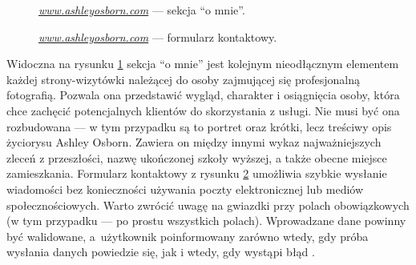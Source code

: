 \documentclass[a4paper, 12pt]{article}
\numberwithin{figure}{section}
\begin{document}
\begin{sloppypar}
\begin{figure}[H] 
    \centering
   \caption{\textit{\url{www.ashleyosborn.com}} --- sekcja ``o mnie''.}
   \label{fig:ashley-2.jpg}
\end{figure}

\begin{figure}[H] 
    \centering
   \caption{\textit{\url{www.ashleyosborn.com}} --- formularz kontaktowy.}
   \label{fig:ashley-3.jpg}
\end{figure}

\newpage

Widoczna na rysunku \ref{fig:ashley-2.jpg} sekcja ``o mnie'' jest kolejnym nieodłącznym elementem każdej strony-wizytówki należącej do osoby zajmującej się profesjonalną fotografią. Pozwala ona przedstawić wygląd, charakter i osiągnięcia osoby, która chce zachęcić potencjalnych klientów do skorzystania z usługi. Nie musi być ona rozbudowana --- w tym przypadku są to portret oraz krótki, lecz treściwy opis życiorysu Ashley Osborn. Zawiera on między innymi wykaz najważniejszych zleceń z przeszłości, nazwę ukończonej szkoły wyższej, a także obecne miejsce zamieszkania. Formularz kontaktowy z rysunku \ref{fig:ashley-3.jpg} umożliwia szybkie wysłanie wiadomości bez konieczności używania poczty elektronicznej lub mediów społecznościowych. Warto zwrócić uwagę na gwiazdki przy polach obowiązkowych (w tym przypadku --- po prostu wszystkich polach). Wprowadzane dane powinny być walidowane, a~użytkownik poinformowany zarówno wtedy, gdy próba wysłania danych powiedzie się, jak i wtedy, gdy wystąpi błąd \cite{formularze}. 


\end{sloppypar}
\end{document}
